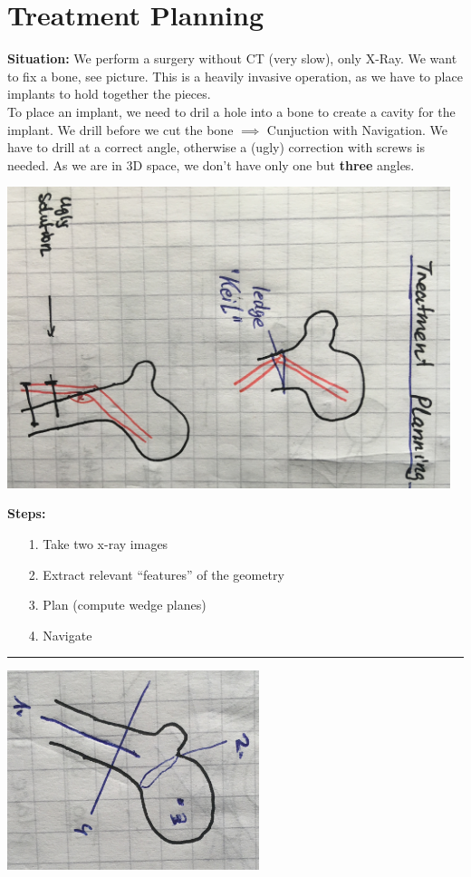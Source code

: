 \documentclass{exerciseBlue}
\begin{document}
\section{Treatment Planning}
\textbf{Situation:} We perform a surgery without CT (very slow), only X-Ray. We want to fix a bone, see picture. This is a heavily invasive operation, as we have to place implants to hold together the pieces. \\
To place an implant, we need to dril a hole into a bone to create a cavity for the implant. We drill before we cut the bone $\implies$ Cunjuction with Navigation. We have to drill at a correct angle, otherwise a (ugly) correction with screws is needed. As we are in 3D space, we don't have only one but \textbf{three} angles.\\
\begin{center}
	\includegraphics[height = 8.8cm]{Images/TreatmentPlanning1}
\end{center}
\textbf{Steps:}
\begin{enumerate}
	\item[1.] Take two x-ray images
	\item[2.] Extract relevant ``features'' of the geometry
	\item[3.] Plan (compute wedge planes)
	\item[4.] Navigate
\end{enumerate}
\noindent\rule{\textwidth}{0.3pt}
\begin{center}
	\includegraphics[height = 5.8cm]{Images/Femur}
\end{center}
\end{document}
